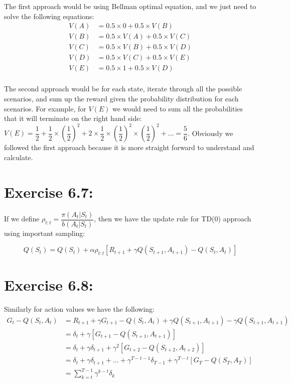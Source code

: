\documentclass[10pt,letterpaper]{article}
\begin{document}
The first approach would be using Bellman optimal equation, and we just need to solve the following equations:
\begin{align*}
V(A) &= 0.5\times 0 + 0.5\times V(B)\\
V(B) &= 0.5\times V(A) + 0.5\times V(C)\\
V(C) &= 0.5\times V(B) + 0.5\times V(D)\\
V(D) &= 0.5\times V(C) + 0.5\times V(E)\\
V(E) &= 0.5\times 1 + 0.5\times V(D)\\
\end{align*}

The second approach would be for each state, iterate through all the possible scenarios, and sum up the reward given the probability distribution for each scenarios. For example, for $V(E)$ we would need to sum all the probabilities that it will terminate on the right hand side: $V(E) = \dfrac{1}{2} + \dfrac{1}{2}\times (\dfrac{1}{2})^2+ 2\times \dfrac{1}{2} \times (\dfrac{1}{2})^2 \times (\dfrac{1}{2})^2 + ... = \dfrac{5}{6}$. Obviously we followed the first approach because it is more straight forward to understand and calculate.


\section*{Exercise 6.7: }
\label{6.7}

If we define $\rho_{t:t} = \dfrac{\pi(A_t|S_t)}{b(A_t|S_t)}$, then we have the update rule for TD(0) approach using important sampling:

\begin{equation*}
Q(S_t) = Q(S_t) + \alpha\rho_{t:t}[R_{t+1} + \gamma Q(S_{t+1}, A_{t+1}) - Q(S_t,A_t)]
\end{equation*}


\section*{Exercise 6.8: }
\label{6.8}

Similarly for action values we have the following:
\begin{align*}
G_t - Q(S_t,A_t) &= R_{t+1} + \gamma G_{t+1} - Q(S_t,A_t) + \gamma Q(S_{t+1},A_{t+1})-\gamma Q(S_{t+1},A_{t+1})\\
&= \delta_t + \gamma[G_{t+1} - Q(S_{t+1}, A_{t+1})]\\
&= \delta_t + \gamma\delta_{t+1} + \gamma^2[G_{t+2} - Q(S_{t+2}, A_{t+2})]\\
&= \delta_t + \gamma\delta_{t+1} + ... + \gamma^{T-t-1}\delta_{T-1} + \gamma^{T-t}[G_{T} - Q(S_{T}, A_{T})]\\
&= \sum_{k=t}^{T-1}\gamma^{k-t}\delta_k
\end{align*}
\end{document}
